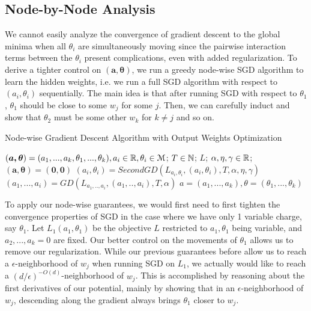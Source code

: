 \subsection{Node-by-Node Analysis}
We cannot easily analyze the convergence of gradient descent to the global minima when all $\theta_i$ are simultaneously moving since the pairwise interaction terms between the $\theta_i$ present complications, even with added regularization. To derive a tighter control on $(\boldsymbol{a,\theta})$, we run a greedy
node-wise SGD  algorithm to learn the hidden weights, i.e. we run a
full SGD algorithm with respect to $(a_i,\theta_i)$ sequentially. The
main idea is that after running SGD with respect to $\theta_1$,
$\theta_1$ should be close to some $w_j$ for some $j$. Then, we can
carefully induct and show that $\theta_2$ must be some other $w_k$ for
$k\neq j$ and so on.

%
\begin{algorithm}[tb]
 \caption{Node-wise Gradient Descent Algorithm with Output Weights Optimization}
   \label{NodeGDOpt}
\begin{algorithmic}
  $(\boldsymbol{a,\theta}) = (a_1,...,a_k,\theta_1,...,\theta_k), a_i
  \in{\mathbb{R}}, \theta_i\in\mathcal{M}$;
  $T\in {\mathbb{N}}$; $L$; $\alpha, \eta, \gamma \in {\mathbb{R}}$; 
    $\boldsymbol{(a,\theta) = (0,0)}$
  \State $(a_i, \theta_i) = SecondGD \left(L_{a_i, \theta_i},(a_i,\theta_i),T, \alpha,\eta,\gamma \right)$
   \State    $(a_1,...,a_i) =  GD \left(L_{a_1,..,a_i},
     (a_1,..,a_i), T , \alpha \right)$\;
   \EndFor
    $a = (a_1,...,a_k), \theta = (\theta_1,..., \theta_k)$
   \end{algorithmic}
\end{algorithm}

To apply our node-wise guarantees, we would first need to first tighten the convergence properties of SGD in the case where we have only 1 variable charge, say $\theta_1$. Let $L_1(a_1,\theta_1)$ be the objective $L$ restricted to $a_1,\theta_1$ being variable, and $a_2,...,a_k = 0$ are fixed. Our better control on the movements of $\theta_1$ allows us to remove our regularization. While our previous guarantees before allow us to reach a $\epsilon$-neighborhood of $w_j$ when running SGD on $L_1$, we actually would like to reach a $(d/\epsilon)^{-O(d)}$-neighborhood of $w_j$. This is accomplished by reasoning about the first derivatives of our potential, mainly by showing that in an $\epsilon$-neighborhood of $w_j$, descending along the gradient always brings $\theta_1$ closer to $w_j$.

